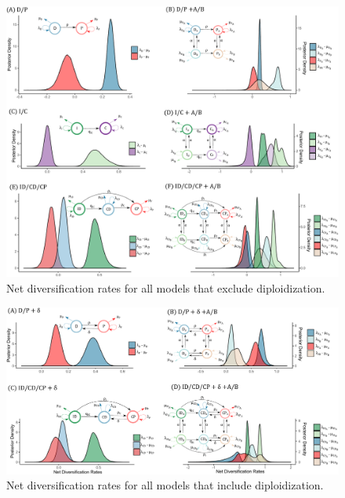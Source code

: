 
\begin{figure}
\includegraphics[width=\textwidth]{allnetdivmodelswithoutdelta.pdf}
\caption{Net diversification rates for all models that exclude diploidization.}
\label{figure:netdivall}
\end{figure}

\begin{figure}
\includegraphics[width=\textwidth]{allnetdivmodelsdiploidization.pdf}
\caption{Net diversification rates for all models that include diploidization.}  
\label{figure:netdivnodip}
\end{figure}

